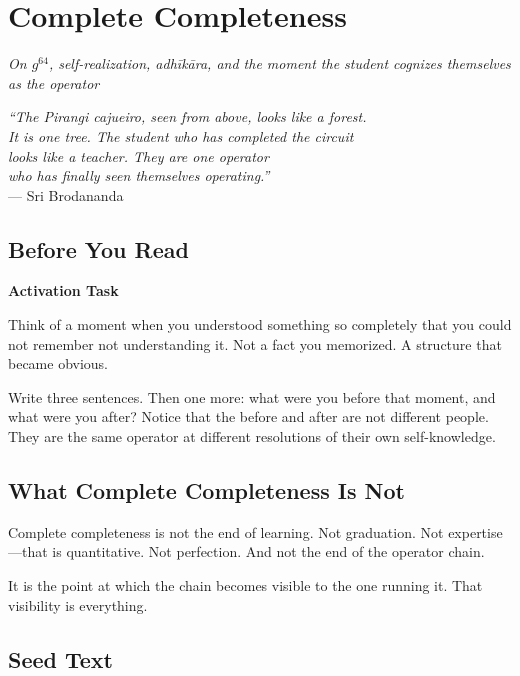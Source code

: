 \documentclass[11pt, twoside, openright]{book}
\theoremstyle{plain}
\theoremstyle{definition}
\newenvironment{activationbox}{%
  \begin{mdframed}[backgroundcolor=AlertBox,linecolor=orange!70,linewidth=0.5pt,innertopmargin=6pt,innerbottommargin=6pt]
  \noindent\textbf{Activation Task}\par\medskip}{\end{mdframed}}
\begin{document}
\chapter{Complete Completeness}
\textit{On $g^{64}$, self-realization, adh\={i}k\={a}ra, and the moment
the student cognizes themselves as the operator}

\begin{flushright}
\textit{``The Pirangi cajueiro, seen from above, looks like a forest.\\
It is one tree. The student who has completed the circuit\\
looks like a teacher. They are one operator\\
who has finally seen themselves operating.''}\\
--- Sri Brodananda
\end{flushright}

\section{Before You Read}

\begin{activationbox}
Think of a moment when you understood something so completely that
you could not remember not understanding it. Not a fact you memorized.
A structure that became obvious.

Write three sentences. Then one more: what were you before that moment,
and what were you after? Notice that the before and after are not
different people. They are the same operator at different resolutions
of their own self-knowledge.
\end{activationbox}

\section{What Complete Completeness Is Not}
Complete completeness is not the end of learning. Not graduation. Not
expertise---that is quantitative. Not perfection. And not the end of the
operator chain.

It is the point at which the chain becomes visible to the one running it.
That visibility is everything.

\section{Seed Text}
\end{document}

